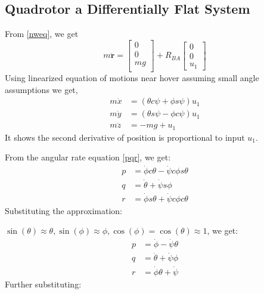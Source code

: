 \documentclass[conference,onecolumn,10pt]{IEEEtran}
\begin{document}
\subsection{Quadrotor a Differentially Flat System}
From \eqref{nweq}, we get 
\begin{equation}
\label{nweq2}
m\ddot{\textbf{r}} = \begin{bmatrix}
0 \\
0\\
mg \\
\end{bmatrix} + R_{BA} \begin{bmatrix}
0 \\
0\\
u_1
\end{bmatrix}
\end{equation}
Using linearized equation of motions near hover assuming small angle assumptions we get, 
\begin{equation}
\label{Dfu1}
\begin{aligned}
m\ddot{x} &= (\theta c \psi + \phi s \psi)u_1 \\
m\ddot{y} &= (\theta s \psi - \phi c \psi)u_1 \\
m\ddot{z} &= -mg + u_1
\end{aligned}
\end{equation}
It shows the second derivative of position is proportional to input $u_1$. 

From the angular rate equation \eqref{pqr}, we get:
\begin{equation}
\label{DFu2}
\begin{aligned}
p &= \dot{\phi}c\theta - \dot{\psi}c \phi s \theta  \\
q & = \dot{\theta} + \dot{\psi}s \phi \\
r & = \dot{\phi} s \theta + \dot{\psi}c\phi c \theta 
\end{aligned}
\end{equation} 
Substituting the approximation:

$\sin(\theta) \approx \theta, \sin(\phi) \approx \phi, \cos(\phi) = \cos(\theta) \approx 1$, we get:
\begin{equation}
\label{DFu2qpqr}
\begin{aligned}
p &= \dot{\phi} - \dot{\psi} \theta  \\
q & = \dot{\theta} + \dot{\psi}\phi \\
r & = \dot{\phi} \theta + \dot{\psi}
\end{aligned}
\end{equation}
Further substituting: 
\end{document}
